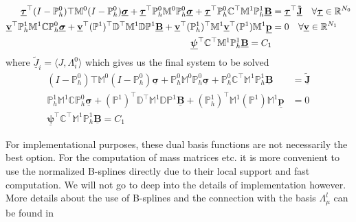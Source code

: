 \documentclass[../master_thesis.tex]{subfiles}
\begin{document}
\begin{align*}
    \underline{\bm{\tau}}^\top (I-\mathbb{P}^0_h)\top \mathbb{M}^0 
        (I-\mathbb{P}^0_h)\underline{\bm{\sigma}} 
        + \underline{\bm{\tau}}^\top \mathbb{P}^0_h \mathbb{M}^0 \mathbb{P}^0_h \underline{\bm{\sigma }}
        + \underline{\bm{\tau}}^\top \mathbb{P}^0_h \mathbb{C} ^\top \mathbb{M}^1 \mathbb{P}^1_h 
        \underline{\mathbf{B}} &= \underline{\bm{\tau}}^\top \underline{\tilde{\mathbf{J}}} \quad \forall \underline{\bm{\tau}} \in \mathbb{R}^{N_0}
    \\ \underline{\mathbf{v}}^\top \mathbb{P}^1_h \mathbb{M}^1 \mathbb{C} \mathbb{P}^0_h \underline{\bm{\sigma }}
        + \underline{\mathbf{v}}^\top (\mathbb{P}^1)^\top \mathbb{D}^\top \mathbb{M}^1 
        \mathbb{D} \mathbb{P}^1 \underline{\mathbf{B}} + \underline{\mathbf{v}}^\top (\mathbb{P}^1_h)^\top \mathbb{M}^1
        \underline{\mathbf{v}}^\top (\mathbb{P}^1) \mathbb{M}^1 \underline{\mathbf{p}} &= 0 
        \quad \forall \underline{\mathbf{v}} \in \mathbb{R}^{N_1}
    \\ \underline{\bm{\psi}}^\top \mathbb{C}^\top \mathbb{M}^1 \mathbb{P}^1_h \underline{\mathbf{B}} = C_1
\end{align*}
where $\underline{\tilde{J}}_i = \langle J, \Lambda^0_i \rangle$
which gives us the final system to be solved 
\begin{align*}
    (I-\mathbb{P}^0_h)\top \mathbb{M}^0 
        (I-\mathbb{P}^0_h)\underline{\bm{\sigma}} 
        +  \mathbb{P}^0_h \mathbb{M}^0 \mathbb{P}^0_h \underline{\bm{\sigma }}
        +  \mathbb{P}^0_h \mathbb{C} ^\top \mathbb{M}^1 \mathbb{P}^1_h 
        \underline{\mathbf{B}} &=  \underline{\tilde{\mathbf{J}}} 
    \\ \mathbb{P}^1_h \mathbb{M}^1 \mathbb{C} \mathbb{P}^0_h \underline{\bm{\sigma }}
        + (\mathbb{P}^1)^\top \mathbb{D}^\top \mathbb{M}^1 
        \mathbb{D} \mathbb{P}^1 \underline{\mathbf{B}} + (\mathbb{P}^1_h)^\top \mathbb{M}^1
        (\mathbb{P}^1) \mathbb{M}^1 \underline{\mathbf{p}} &= 0 
    \\ \underline{\bm{\psi}}^\top \mathbb{C}^\top \mathbb{M}^1 \mathbb{P}^1_h \underline{\mathbf{B}} = C_1
\end{align*}

\begin{remark}
    For implementational purposes, these dual basis functions are not necessarily the 
    best option. For the computation of mass matrices etc. 
    it is more convenient to use the normalized B-splines directly due to their 
    local support and fast computation.
    We will not 
    go to deep into the details of implementation however. More details about the 
    use of B-splines and the connection with the basis $\Lambda^l_\mu$ can be found 
    in \cite[Sec.\,4.8]{multipatch_paper} 
\end{remark}
\end{document}
